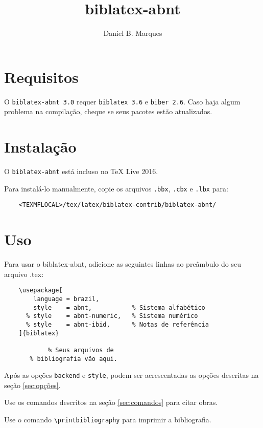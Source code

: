 \documentclass[a4paper]{article}
\title{biblatex-abnt \version}
\author{Daniel B. Marques}
\newcommand{\version}{3.0}
\newcommand{\requirements}{\texttt{biblatex 3.6} e \texttt{biber 2.6}}
\begin{document}

\maketitle

\tableofcontents

\clearpage
\section{Requisitos}%

O \texttt{biblatex-abnt \version} requer \requirements. Caso haja algum
problema na compilação, cheque se seus pacotes estão atualizados.

\section{Instalação}%

O \texttt{biblatex-abnt} está incluso no TeX Live 2016.

Para instalá-lo manualmente, copie os arquivos \texttt{.bbx}, \texttt{.cbx} e
\texttt{.lbx} para:
\begin{verbatim}
    <TEXMFLOCAL>/tex/latex/biblatex-contrib/biblatex-abnt/
\end{verbatim}

\section{Uso}%

Para usar o {biblatex-abnt}, adicione as seguintes linhas ao preâmbulo do seu
arquivo {.tex}:

\begin{verbatim}
    \usepackage[
        language = brazil,
        style    = abnt,           % Sistema alfabético
      % style    = abnt-numeric,   % Sistema numérico
      % style    = abnt-ibid,      % Notas de referência
    ]{biblatex}

            % Seus arquivos de
       % bibliografia vão aqui.
\end{verbatim}

Após as opções \texttt{backend} e \texttt{style}, podem ser acrescentadas
as opções descritas na seção \ref{sec:opções}.

Use os comandos descritos na seção \ref{sec:comandos} para citar obras.

Use o comando \verb"\printbibliography" para imprimir a bibliografia.
\end{document}
